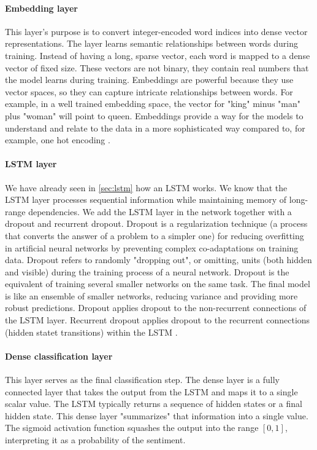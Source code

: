 \documentclass{article}
\begin{document}
\paragraph{Embedding layer}
This layer's purpose is to convert integer-encoded word indices into dense vector representations.
The layer learns semantic relationships between words during training.
Instead of having a long, sparse vector, each word is mapped to a dense vector of fixed size.
These vectors are not binary, they contain real numbers that the model learns during training.
Embeddings are powerful because they use vector spaces, so they can capture intricate relationships between words.
For example, in a well trained embedding space, the vector for "king" minus "man" plus "woman" will point to queen.
Embeddings provide a way for the models to understand and relate to the data in a more sophisticated way compared to, for example, one hot encoding \cite{mediumDoesEmbedding}.

\paragraph{LSTM layer}
We have already seen in \ref{sec:lstm} how an LSTM works. 
We know that the LSTM layer processes sequential information while maintaining memory of long-range dependencies.
We add the LSTM layer in the network together with a dropout and recurrent dropout.
Dropout is a regularization technique (a process that converts the answer of a problem to a simpler one) for reducing overfitting in artificial neural networks by preventing complex co-adaptations on training data.
Dropout refers to randomly "dropping out", or omitting, units (both hidden and visible) during the training process of a neural network.
Dropout is the equivalent of training several smaller networks on the same task.
The final model is like an ensemble of smaller networks, reducing variance and providing more robust predictions.
Dropout applies dropout to the non-recurrent connections of the LSTM layer.
Recurrent dropout applies dropout to the recurrent connections (hidden statet transitions) within the LSTM \cite{wikipediaDilutionneural}.

\paragraph{Dense classification layer}
This layer serves as the final classification step.
The dense layer is a fully connected layer that takes the output from the LSTM and maps it to a single scalar value.
The LSTM typically returns a sequence of hidden states or a final hidden state.
This dense layer "summarizes" that information into a single value.
The sigmoid activation function squashes the output into the range $[0,1]$, interpreting it as a probability of the sentiment.
\end{document}
